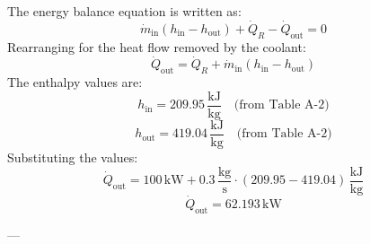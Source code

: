 The energy balance equation is written as:  
\[
\dot{m}_{\text{in}} (h_{\text{in}} - h_{\text{out}}) + \dot{Q}_R - \dot{Q}_{\text{out}} = 0
\]  
Rearranging for the heat flow removed by the coolant:  
\[
\dot{Q}_{\text{out}} = \dot{Q}_R + \dot{m}_{\text{in}} (h_{\text{in}} - h_{\text{out}})
\]  
The enthalpy values are:  
\[
h_{\text{in}} = 209.95 \, \frac{\text{kJ}}{\text{kg}} \quad \text{(from Table A-2)}
\]  
\[
h_{\text{out}} = 419.04 \, \frac{\text{kJ}}{\text{kg}} \quad \text{(from Table A-2)}
\]  
Substituting the values:  
\[
\dot{Q}_{\text{out}} = 100 \, \text{kW} + 0.3 \, \frac{\text{kg}}{\text{s}} \cdot (209.95 - 419.04) \, \frac{\text{kJ}}{\text{kg}}
\]  
\[
\dot{Q}_{\text{out}} = 62.193 \, \text{kW}
\]  

---